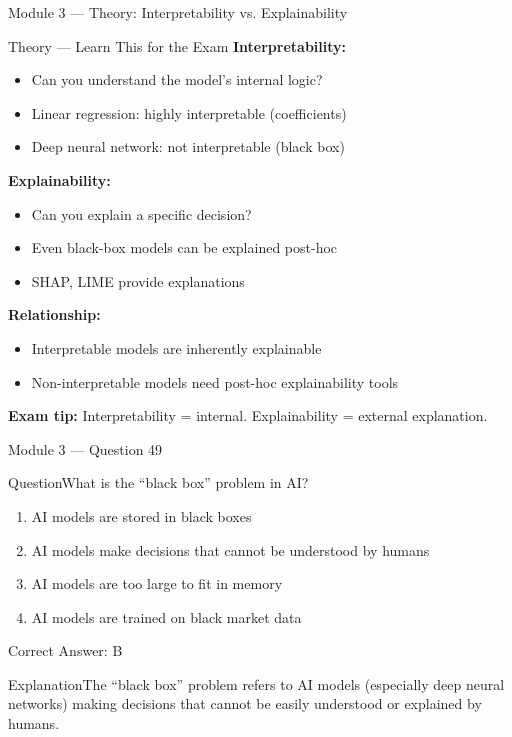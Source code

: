 \documentclass[aspectratio=169,10pt]{beamer}
\newcommand{\question}[1]{\begin{block}{Question}#1\end{block}}
\newcommand{\options}[4]{%
	\begin{enumerate}[label=\Alph*.,leftmargin=*]
		\item #1
		\item #2
		\item #3
		\item #4
	\end{enumerate}
}
\newcommand{\answerbox}[1]{\begin{exampleblock}{Correct Answer: #1}\end{exampleblock}}
\newcommand{\explain}[1]{\begin{block}{Explanation}#1\end{block}}
\newcommand{\theory}[1]{%
	\begin{block}{Theory --- Learn This for the Exam}
		\small #1
	\end{block}
}
\begin{document}
	\begin{frame}{Module 3 --- Theory: Interpretability vs. Explainability}
		\theory{
			\textbf{Interpretability:}
			\begin{itemize}
				\item Can you understand the model's internal logic?
				\item Linear regression: highly interpretable (coefficients)
				\item Deep neural network: not interpretable (black box)
			\end{itemize}
			\textbf{Explainability:}
			\begin{itemize}
				\item Can you explain a specific decision?
				\item Even black-box models can be explained post-hoc
				\item SHAP, LIME provide explanations
			\end{itemize}
			\textbf{Relationship:}
			\begin{itemize}
				\item Interpretable models are inherently explainable
				\item Non-interpretable models need post-hoc explainability tools
			\end{itemize}
			\textbf{Exam tip:} Interpretability = internal. Explainability = external explanation.
		}
	\end{frame}
	
	\begin{frame}{Module 3 --- Question 49}
		\question{What is the ``black box'' problem in AI?}
		\options{AI models are stored in black boxes}{AI models make decisions that cannot be understood by humans}{AI models are too large to fit in memory}{AI models are trained on black market data}
		\answerbox{B}
		\explain{The ``black box'' problem refers to AI models (especially deep neural networks) making decisions that cannot be easily understood or explained by humans.}
	\end{frame}
	
\end{document}
